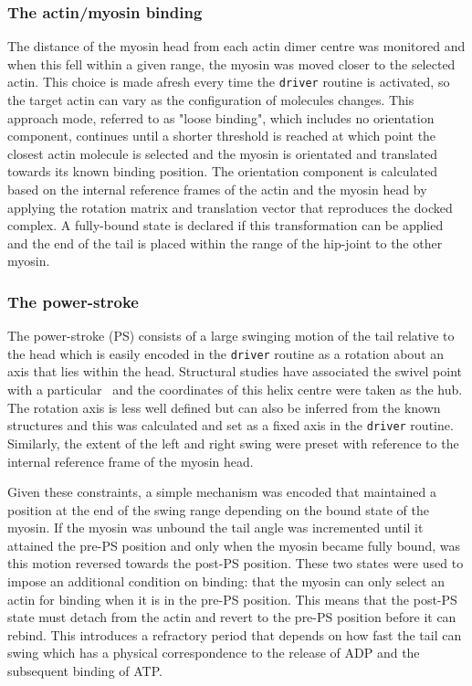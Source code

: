 \subsubsection{The actin/myosin binding}

The distance of the myosin head from each actin dimer centre was 
monitored and when this fell within a given range, the myosin was
moved closer to the selected actin.   This choice is made afresh every time
the {\tt driver} routine is activated, so the target actin can vary as the
configuration of molecules changes.  This approach mode, referred to as "loose
binding", which includes no orientation component, continues until a shorter
threshold is reached at which point the closest actin molecule is selected
and the myosin is orientated and translated towards its known binding 
position.   The orientation component is calculated based on the internal
reference frames of the actin and the myosin head by applying the rotation
matrix and translation vector that reproduces the docked complex.
A fully-bound state is declared if this transformation can be applied and
the end of the tail is placed within the range of the hip-joint to the
other myosin. 

\subsubsection{The power-stroke}

The power-stroke (PS) consists of a large swinging motion of the tail relative
to the head which is easily encoded in the {\tt driver} routine as a rotation
about an axis that lies within the head.  Structural studies have associated
the swivel point with a particular \AH\ and the coordinates of this helix
centre were taken as the hub.   The rotation axis is less well defined but can
also be inferred from the known structures and this was calculated and set as
a fixed axis in the {\tt driver} routine.   Similarly, the extent of the left 
and right swing were preset with reference to the internal reference frame of
the myosin head.

Given these constraints, a simple mechanism was encoded that maintained a
position at the end of the swing range depending on the bound state of the 
myosin.   If the myosin was unbound the tail angle was incremented until it
attained the pre-PS position and only when the myosin became fully bound, was
this motion reversed towards the post-PS position.   These two states were
used to impose an additional condition on binding: that the myosin can only
select an actin for binding when it is in the pre-PS position.   This means
that the post-PS state must detach from the actin and revert to the pre-PS
position before it can rebind.  This introduces a refractory period that 
depends on how fast the tail can swing which has a physical correspondence
to the release of ADP and the subsequent binding of ATP.


